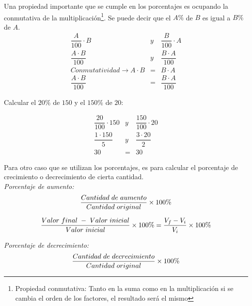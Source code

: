Una propiedad importante que se cumple en los porcentajes es ocupando la conmutativa de la multiplicación\footnote{Propiedad conmutativa: Tanto en la suma como en la multiplicación si se cambia el orden de los factores, el resultado será el mismo}. Se puede decir que el $A\%$ de $B$ es igual a $B\%$ de $A$. 
\begin{eqnarray*}
\dfrac{A}{100}\cdot B &y&  \dfrac{B}{100}\cdot A \\
\dfrac{A\cdot B}{100} &y&  \dfrac{B\cdot A}{100} \\
Conmutatividad \longrightarrow A\cdot B &=& B\cdot A\\
\dfrac{A\cdot B}{100} &=& \dfrac{B\cdot A}{100}
\end{eqnarray*}

\begin{myexample}
Calcular el $20\%$ de $150$ y el $150\%$ de $20$:
\end{myexample}

\begin{eqnarray*}
\dfrac{20}{100}\cdot 150 &y&  \dfrac{150}{100}\cdot 20 \\
\dfrac{1\cdot 150}{5} &y&  \dfrac{3\cdot 20}{2} \\
30 &=& 30
\end{eqnarray*}

Para otro caso que se utilizan los porcentajes, es para calcular el porcentaje de crecimiento o decrecimiento de cierta cantidad.\\

\noindent \textit{Porcentaje de aumento:}\\
\begin{eqnarray}
\dfrac{Cantidad\hspace{3px}de\hspace{3px}aumento}{Cantidad\hspace{3px}original}\times 100\%
\end{eqnarray}

\begin{eqnarray}
\dfrac{Valor\hspace{3px}final\hspace{3px}-\hspace{3px}Valor\hspace{3px}inicial}{Valor\hspace{3px}inicial}\times 100\%= \dfrac{V_{f}-V_{i}}{V_{i}}\times 100\%
\end{eqnarray}


\noindent \textit{Porcentaje de decrecimiento:}\\
\begin{eqnarray}
\dfrac{Cantidad\hspace{3px}de\hspace{3px}decrecimiento}{Cantidad\hspace{3px}original}\times 100\%
\end{eqnarray}

